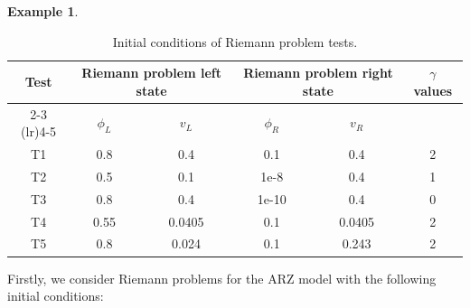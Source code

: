 \documentclass[times,final,11pt]{elsarticle}
\numberwithin{equation}{section}
\theoremstyle{definition}
\newtheorem{exa}[remark]{Example}
\theoremstyle{remark}
\begin{document}
\begin{exa} \label{exam4}
	\begin{table}[h!]
		\renewcommand\arraystretch{1.2}
		\centering
		\caption{\sf Initial conditions of Riemann problem tests.}
		\begin{tabular}{c cc cc c}
			
			\toprule[1.5pt]
			
			\multirow{2}{*}{Test} & \multicolumn{2}{c}{Riemann problem left state} & \multicolumn{2}{c}{Riemann problem right state} &  \multirow{2}{*}{$\gamma$ values}\\
			
			\cmidrule(lr){2-3} \cmidrule(lr){4-5}
			
			& $\phi_L$ & $v_L$ & $\phi_R$ & $v_R$ & \\
			
			\midrule[1.5pt]
			
			T1 & 0.8  & 0.4    & 0.1  & 0.4    & 2 \\
			T2 & 0.5  & 0.1    & 1e-8 & 0.4    & 1 \\
			T3 & 0.8  & 0.4    & 1e-10 & 0.4    & 0 \\
			T4 & 0.55 & 0.0405 & 0.1  & 0.0405 & 2 \\ 
			T5 & 0.8  & 0.024  & 0.1  & 0.243  & 2 \\ 
			
			\bottomrule[1.5pt]
			
		\end{tabular}
		\label{Riemann}
	\end{table}
	Firstly, we consider Riemann problems for the ARZ model with the following initial conditions:


\end{exa}
\end{document}

